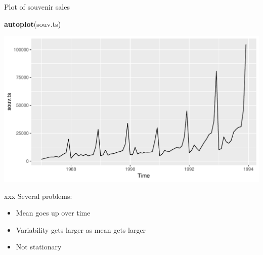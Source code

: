 \documentclass[ignorenonframetext,]{beamer}
\newenvironment{Shaded}{\begin{snugshade}}{\end{snugshade}}
\newcommand{\KeywordTok}[1]{\textcolor[rgb]{0.13,0.29,0.53}{\textbf{#1}}}
\newcommand{\NormalTok}[1]{#1}
\providecommand{\tightlist}{%
  \setlength{\itemsep}{0pt}\setlength{\parskip}{0pt}}
\begin{document}
\begin{frame}[fragile]{Plot of souvenir sales}
\protect\hypertarget{plot-of-souvenir-sales}{}

\begin{Shaded}
\begin{Highlighting}[]
\KeywordTok{autoplot}\NormalTok{(souv.ts)}
\end{Highlighting}
\end{Shaded}

\includegraphics{figure/unnamed-chunk-34-1.pdf}

\end{frame}

\begin{frame}{xxx Several problems:}
\protect\hypertarget{xxx-several-problems}{}

\begin{itemize}
\tightlist
\item
  Mean goes up over time
\item
  Variability gets larger as mean gets larger
\item
  Not stationary
\end{itemize}

\end{frame}
\end{document}
